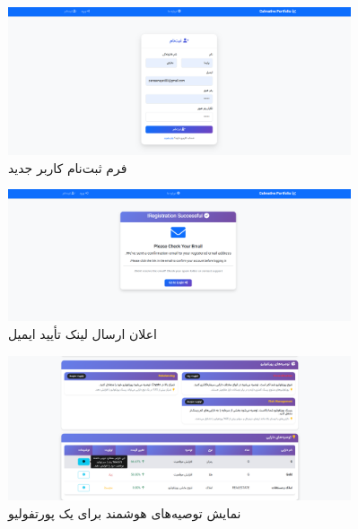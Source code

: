 \begin{figure}[H]
\centering
\includegraphics[width=0.9\textwidth]{../figures/2. صفحه ثبت نام.png}
\caption{فرم ثبت‌نام کاربر جدید}
\end{figure}

\begin{figure}[H]
\centering
\includegraphics[width=0.9\textwidth]{../figures/3. صفحه ارسال ایمیل تایید.png}
\caption{اعلان ارسال لینک تأیید ایمیل}
\end{figure}


\begin{figure}[H]
\centering
\includegraphics[width=0.9\textwidth]{../figures/21. دریافت توصیه هوشمند برای پورتفولیو.png}
\caption{نمایش توصیه‌های هوشمند برای یک پورتفولیو}
\end{figure}

\pagebreak